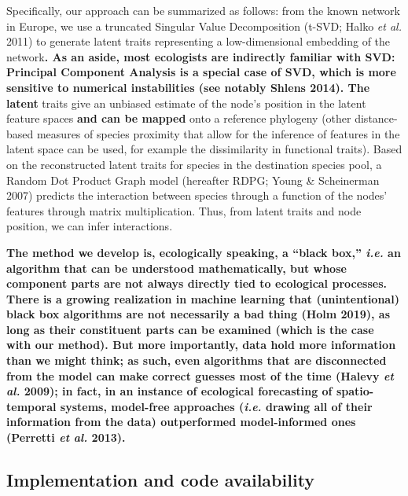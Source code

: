 \documentclass[11pt]{article}
\makeatletter
\def\maxwidth{\ifdim\Gin@nat@width>\linewidth\linewidth
\else\Gin@nat@width\fi}
\let\Oldincludegraphics\includegraphics
\renewcommand{\includegraphics}[1]{\Oldincludegraphics[width=\maxwidth]{#1}}
\providecommand{\DIFaddtex}[1]{{\bf #1}} %
\providecommand{\DIFdeltex}[1]{} %
\providecommand{\DIFaddbegin}{\protect\color{blue}} %
\providecommand{\DIFaddend}{\protect\color{black}} %
\providecommand{\DIFdelbegin}{\protect\color{red}} %
\providecommand{\DIFdelend}{\protect\color{black}} %
\providecommand{\DIFadd}[1]{\texorpdfstring{\DIFaddtex{#1}}{#1}} %
\providecommand{\DIFdel}[1]{\texorpdfstring{\DIFdeltex{#1}}{}} %
\newcommand{\DIFscaledelfig}{0.5}
\newlength{\DIFdelgraphicswidth} %
\newlength{\DIFdelgraphicsheight} %
\newcommand{\DIFaddincludegraphics}[2][]{{\color{blue}\fbox{\DIFOincludegraphics[#1]{#2}}}} %
\newcommand{\DIFdelincludegraphics}[2][]{%
\sbox{\DIFdelgraphicsbox}{\DIFOincludegraphics[#1]{#2}}%
\settoboxwidth{\DIFdelgraphicswidth}{\DIFdelgraphicsbox} %
\settoboxtotalheight{\DIFdelgraphicsheight}{\DIFdelgraphicsbox} %
\scalebox{\DIFscaledelfig}{%
\parbox[b]{\DIFdelgraphicswidth}{\usebox{\DIFdelgraphicsbox}\\[-\baselineskip] \rule{\DIFdelgraphicswidth}{0em}}\llap{\resizebox{\DIFdelgraphicswidth}{\DIFdelgraphicsheight}{%
\setlength{\unitlength}{\DIFdelgraphicswidth}%
\begin{picture}(1,1)%
\thicklines\linethickness{2pt} %
{\color[rgb]{1,0,0}\put(0,0){\framebox(1,1){}}}%
{\color[rgb]{1,0,0}\put(0,0){\line( 1,1){1}}}%
{\color[rgb]{1,0,0}\put(0,1){\line(1,-1){1}}}%
\end{picture}%
}\hspace*{3pt}}} %
} %
\DeclareRobustCommand{\DIFaddbegin}{\DIFOaddbegin \let\includegraphics\DIFaddincludegraphics} %
\DeclareRobustCommand{\DIFaddend}{\DIFOaddend \let\includegraphics\DIFOincludegraphics} %
\DeclareRobustCommand{\DIFdelbegin}{\DIFOdelbegin \let\includegraphics\DIFdelincludegraphics} %
\DeclareRobustCommand{\DIFdelend}{\DIFOaddend \let\includegraphics\DIFOincludegraphics} %
\makeatother
\begin{document}
Specifically, our approach can be summarized as follows: from the known
network in Europe, we use a truncated Singular Value Decomposition
(t-SVD; Halko \emph{et al.} 2011) to generate latent traits representing
a low-dimensional embedding of the network\DIFdelbegin \DIFdel{; these }\DIFdelend \DIFaddbegin \DIFadd{. As an aside, most ecologists
are indirectly familiar with SVD: Principal Component Analysis is a
special case of SVD, which is more sensitive to numerical instabilities
(see notably Shlens 2014). The latent }\DIFaddend traits give an unbiased estimate
of the node's position in the latent feature spaces \DIFdelbegin \DIFdel{.
Then, we map these latent traits }\DIFdelend \DIFaddbegin \DIFadd{and can be mapped
}\DIFaddend onto a reference phylogeny (other distance-based measures of species
proximity that allow for the inference of features in the latent space
can be used, for example the dissimilarity in functional traits). Based
on the reconstructed latent traits for species in the destination
species pool, a Random Dot Product Graph model (hereafter RDPG; Young \&
Scheinerman 2007) predicts the interaction between species through a
function of the nodes' features through matrix multiplication. Thus,
from latent traits and node position, we can infer interactions.

\DIFaddbegin \DIFadd{The method we develop is, ecologically speaking, a ``black box,''
\emph{i.e.} an algorithm that can be understood mathematically, but
whose component parts are not always directly tied to ecological
processes. There is a growing realization in machine learning that
(unintentional) black box algorithms are not necessarily a bad thing
(Holm 2019), as long as their constituent parts can be examined (which
is the case with our method). But more importantly, data hold more
information than we might think; as such, even algorithms that are
disconnected from the model can make correct guesses most of the time
(Halevy \emph{et al.} 2009); in fact, in an instance of ecological
forecasting of spatio-temporal systems, model-free approaches
(\emph{i.e.} drawing all of their information from the data)
outperformed model-informed ones (Perretti \emph{et al.} 2013).
}

\DIFaddend \hypertarget{implementation-and-code-availability}{%
\subsection{Implementation and code
availability}\label{implementation-and-code-availability}}
\end{document}
